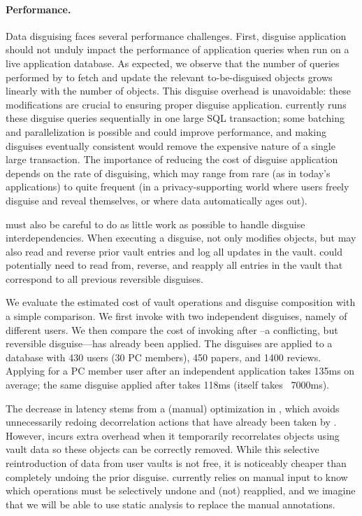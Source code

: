 \paragraph{Performance.}
\label{sec:perf}

Data disguising faces several performance challenges.
%
First, disguise application should not unduly impact the performance of application queries
when run on a live application database.
As expected, we observe that the number of queries performed by \sys to fetch and update the relevant
to-be-disguised objects grows linearly with the number of objects. This disguise overhead is
unavoidable: these modifications are crucial to ensuring proper disguise application.
\sys currently runs these disguise queries sequentially in one large SQL transaction; some batching
and parallelization is possible and could improve performance, and
making disguises eventually consistent would remove the expensive nature of a single large
transaction. The importance of reducing the cost of disguise application depends on the rate of
disguising, which may range from rare (as in today's applications) to quite frequent (in a
privacy-supporting world where users freely disguise and reveal themselves, or where data
automatically ages out).

%
\sys must also be careful to do as little work as possible to handle disguise interdependencies.
When executing a disguise, \sys not only modifies objects, but may also read and reverse prior
vault entries and log all updates in the vault.
%
\sys could potentially need to read from, reverse, and reapply all entries in the vault that correspond
to all previous reversible disguises.

We evaluate the estimated cost of vault operations and disguise composition with a simple
comparison. We first invoke \sys with two independent disguises, namely \hrtbf of different
users. We then compare the cost of invoking \hrtbf after \hconfanon--a conflicting, but reversible
disguise---has already been applied.
The disguises are applied to a database with 430 users (30 PC members), 450 papers, and 1400
reviews.
Applying \hrtbf for a PC member user after an independent \hrtbf application takes 135ms on average;
the same \hrtbf disguise applied after \hconfanon takes 118ms (\hconfanon itself takes
   ~7000ms). 

The decrease in latency stems from a (manual) optimization in \sys, which avoids unnecessarily
redoing decorrelation actions that have already been taken by \hconfanon.  However, \sys incurs
extra overhead when it temporarily recorrelates objects using vault data so these objects can be
correctly removed. While this selective reintroduction of data from user vaults is not free, it
is noticeably cheaper than completely undoing the prior \hconfanon disguise.
\sys currently relies on manual input to know which operations must be selectively undone and (not)
reapplied, and we imagine that we will be able to use static analysis to replace the manual
annotations.
